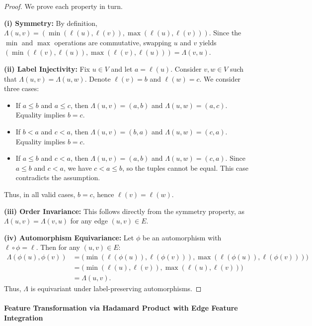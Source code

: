 \documentclass[pdflatex,sn-mathphys-num]{sn-jnl}%
\theoremstyle{thmstyleone}%
\theoremstyle{thmstyletwo}%
\theoremstyle{thmstylethree}%
\theoremstyle{plain} %
\theoremstyle{definition} %
\theoremstyle{remark} %
\theoremstyle{plain} %
\begin{document}
\begin{proof}
We prove each property in turn.
    
\textbf{(i) Symmetry:} By definition, $\Lambda(u, v) = (\min(\ell(u), \ell(v)), \max(\ell(u), \ell(v)))$. Since the $\min$ and $\max$ operations are commutative, swapping $u$ and $v$ yields $(\min(\ell(v), \ell(u)), \max(\ell(v), \ell(u))) = \Lambda(v, u)$.

\textbf{(ii) Label Injectivity:} Fix $u \in V$ and let $a = \ell(u)$. Consider $v, w \in V$ such that $\Lambda(u, v) = \Lambda(u, w)$. Denote $\ell(v) = b$ and $\ell(w) = c$. We consider three cases:

\begin{itemize}
    \item If $a \leq b$ and $a \leq c$, then $\Lambda(u, v) = (a, b)$ and $\Lambda(u, w) = (a, c)$. Equality implies $b = c$.
    \item If $b < a$ and $c < a$, then $\Lambda(u, v) = (b, a)$ and $\Lambda(u, w) = (c, a)$. Equality implies $b = c$.
    \item If $a \leq b$ and $c < a$, then $\Lambda(u, v) = (a, b)$ and $\Lambda(u, w) = (c, a)$. Since $a \leq b$ and $c < a$, we have $c < a \leq b$, so the tuples cannot be equal. This case contradicts the assumption.
\end{itemize}

Thus, in all valid cases, $b = c$, hence $\ell(v) = \ell(w)$.

\textbf{(iii) Order Invariance:} This follows directly from the symmetry property, as $\Lambda(u, v) = \Lambda(v, u)$ for any edge $(u, v) \in E$.

\textbf{(iv) Automorphism Equivariance:} Let $\phi$ be an automorphism with $\ell \circ \phi = \ell$. Then for any $(u, v) \in E$:
\begin{align*}
\Lambda(\phi(u), \phi(v)) 
&= \bigl(\min(\ell(\phi(u)), \ell(\phi(v))), \max(\ell(\phi(u)), \ell(\phi(v)))\bigr) \\
&= \bigl(\min(\ell(u), \ell(v)), \max(\ell(u), \ell(v))\bigr) \\
&= \Lambda(u, v).
\end{align*}
Thus, $\Lambda$ is equivariant under label-preserving automorphisms.
\end{proof}

\paragraph{Feature Transformation via Hadamard Product with Edge Feature Integration}
\end{document}
